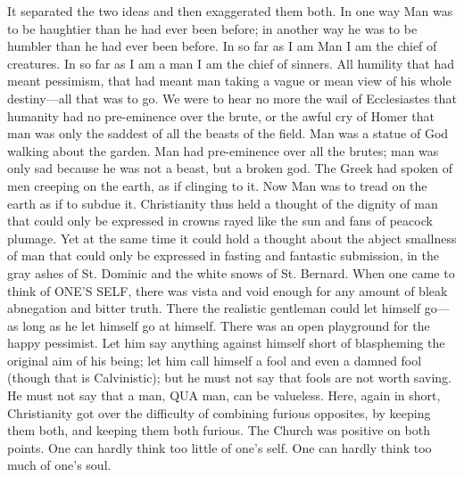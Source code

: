 It separated the two ideas and then exaggerated them both. In one way Man was to be haughtier than he had ever been before; in another way he was to be humbler than he had ever been before. In so far as I am Man I am the chief of creatures. In so far as I am a man I am the chief of sinners. All humility that had meant pessimism, that had meant man taking a vague or mean view of his whole destiny—all that was to go. We were to hear no more the wail of Ecclesiastes that humanity had no pre-eminence over the brute, or the awful cry of Homer that man was only the saddest of all the beasts of the field. Man was a statue of God walking about the garden. Man had pre-eminence over all the brutes; man was only sad because he was not a beast, but a broken god. The Greek had spoken of men creeping on the earth, as if clinging to it. Now Man was to tread on the earth as if to subdue it. Christianity thus held a thought of the dignity of man that could only be expressed in crowns rayed like the sun and fans of peacock plumage. Yet at the same time it could hold a thought about the abject smallness of man that could only be expressed in fasting and fantastic submission, in the gray ashes of St. Dominic and the white snows of St. Bernard. When one came to think of ONE’S SELF, there was vista and void enough for any amount of bleak abnegation and bitter truth. There the realistic gentleman could let himself go—as long as he let himself go at himself. There was an open playground for the happy pessimist. Let him say anything against himself short of blaspheming the original aim of his being; let him call himself a fool and even a damned fool (though that is Calvinistic); but he must not say that fools are not worth saving. He must not say that a man, QUA man, can be valueless. Here, again in short, Christianity got over the difficulty of combining furious opposites, by keeping them both, and keeping them both furious. The Church was positive on both points. One can hardly think too little of one’s self. One can hardly think too much of one’s soul.

